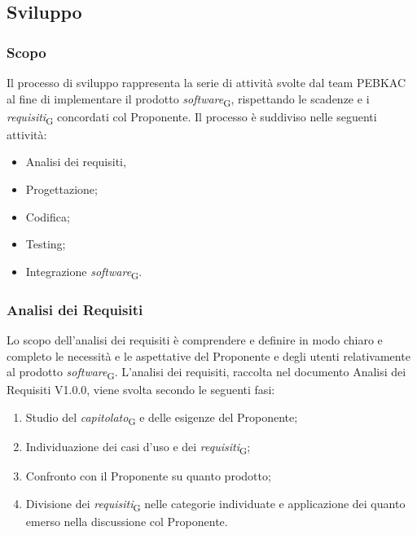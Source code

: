 \subsection{Sviluppo}
\subsubsection{Scopo}
Il processo di sviluppo rappresenta la serie di attività svolte dal team PEBKAC al fine di implementare il prodotto \textit{software}\textsubscript{G}, rispettando le scadenze e i \textit{requisiti}\textsubscript{G} concordati col Proponente. 
Il processo è suddiviso nelle seguenti attività:
\begin{itemize}
    \item Analisi dei requisiti,
    \item Progettazione;
    \item Codifica;
    \item Testing;
    \item Integrazione \textit{software}\textsubscript{G}.
\end{itemize}

\subsubsection{Analisi dei Requisiti}
Lo scopo dell'analisi dei requisiti è comprendere e definire in modo chiaro e completo le necessità e le aspettative del Proponente e degli utenti relativamente al prodotto \textit{software}\textsubscript{G}.
L'analisi dei requisiti, raccolta nel documento Analisi dei Requisiti V1.0.0, viene svolta secondo le seguenti fasi:
\begin{enumerate}
    \item Studio del \textit{capitolato}\textsubscript{G} e delle esigenze del Proponente;
    \item Individuazione dei casi d'uso e dei \textit{requisiti}\textsubscript{G};
    \item Confronto con il Proponente su quanto prodotto;
    \item Divisione dei \textit{requisiti}\textsubscript{G} nelle categorie individuate e applicazione dei quanto emerso nella discussione col Proponente.
\end{enumerate}


